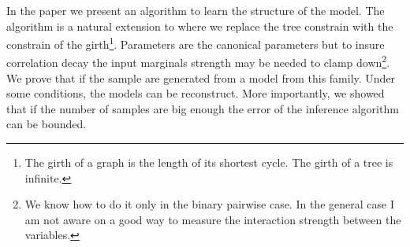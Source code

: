 {In the paper we present an algorithm to learn the structure of the model.
The algorithm is a natural extension to \cite{chowLiu} where we replace the tree constrain with the constrain of the girth\footnote{The girth of a graph is the length of its shortest cycle. The girth of a tree is infinite.}.
Parameters are the canonical parameters but to insure correlation decay the input marginals strength may be needed to clamp down\footnote{We know how to do it only in the binary pairwise case. In the general case I am not aware on a good way to measure the interaction strength between the variables.}.
We prove that if the sample are generated from a model from this family.
Under some conditions, the models can be reconstruct.
More importantly, we showed that if the number of samples are big enough the error of the inference algorithm can be bounded.
}
